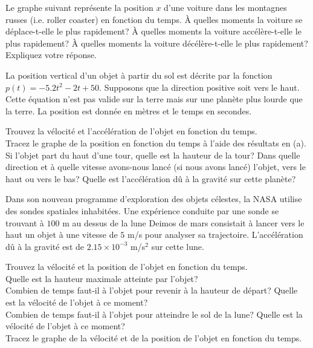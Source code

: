 \begin{question}
Le graphe suivant représente la position $x$ d'une voiture dans les montagnes
russes (i.e. \lgm roller coaster\rgm) en fonction du temps.  À quelles
moments la voiture se déplace-t-elle le plus rapidement?  À quelles moments
la voiture accélère-t-elle le plus rapidement?  À quelles moments la voiture
décélère-t-elle le plus rapidement?  Expliquez votre réponse.
\label{6Q7}
\end{question}

\begin{question}
La position vertical d'un objet à partir du sol est décrite par la
fonction $p(t) = -5.2 t^2 - 2 t + 50$.  Supposons que la direction
positive soit vers le haut.  Cette équation n'est pas valide sur la
terre mais sur une planète plus lourde que la terre.  La position est
donnée en mètres et le temps en secondes.

 Trouvez la vélocité et l'accélération de l'objet en fonction
du temps.\\
 Tracez le graphe de la position en fonction du temps à l'aide
des résultats en (a).\\
 Si l'objet part du haut d'une tour, quelle est la hauteur de
la tour?  Dans quelle direction et à quelle vitesse avons-nous lancé (si
nous avons lancé) l'objet, vers le haut ou vers le bas?  Quelle est
l'accélération dû à la gravité sur cette planète?
\label{6Q8}
\end{question}

\begin{question}
Dans son nouveau programme d'exploration des objets célestes, la NASA
utilise des sondes spatiales inhabitées.  Une expérience conduite par
une sonde se trouvant à $100$ m au dessus de la lune Deimos de mars
consistait à lancer vers le haut un objet à une vitesse de $5$ m/s
pour analyser sa trajectoire. L'accélération dû à la gravité est de
$2.15\times 10^{-3}$ m/s$^2$ sur cette lune.

 Trouvez la vélocité et la position de l'objet en fonction du
temps.\\
 Quelle est la hauteur maximale atteinte par l'objet?\\
 Combien de temps faut-il à l'objet pour revenir à la hauteur
de départ?  Quelle est la vélocité de l'objet à ce moment?\\
 Combien de temps faut-il à l'objet pour atteindre le sol de
la lune? Quelle est la vélocité de l'objet à ce moment?\\
 Tracez le graphe de la vélocité et de la position de l'objet
en fonction du temps.
\label{6Q9}
\end{question}

